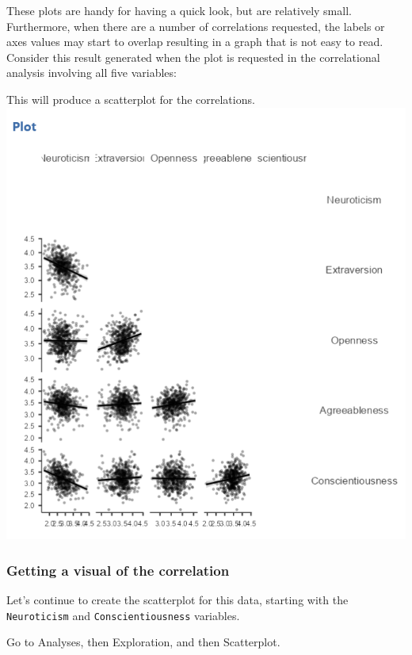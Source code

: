 \documentclass[
]{book}
\begin{document}
These plots are handy for having a quick look, but are relatively small. Furthermore, when there are a number of correlations requested, the labels or axes values may start to overlap resulting in a graph that is not easy to read. Consider this result generated when the plot is requested in the correlational analysis involving all five variables:

This will produce a scatterplot for the correlations.
\includegraphics{img/Correlation2_Plot.png}

\hypertarget{getting-a-visual-of-the-correlation-1}{%
\subsubsection{Getting a visual of the correlation}\label{getting-a-visual-of-the-correlation-1}}

Let's continue to create the scatterplot for this data, starting with the \texttt{Neuroticism} and \texttt{Conscientiousness} variables.

Go to {Analyses}, then {Exploration}, and then {Scatterplot}.
\end{document}
